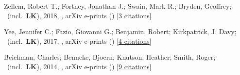 \item[{\color{numcolor}\scriptsize3}] Zellem, Robert T.; Fortney, Jonathan J.; Swain, Mark R.; Bryden, Geoffrey; \etal\ (incl.\ \textbf{LK}), 2018, , arXiv e-prints () [\href{https://ui.adsabs.harvard.edu/abs/2018arXiv180307163Z}{3 citations}]

\item[{\color{numcolor}\scriptsize2}] Yee, Jennifer C.; Fazio, Giovanni G.; Benjamin, Robert; Kirkpatrick, J. Davy; \etal\ (incl.\ \textbf{LK}), 2017, , arXiv e-prints () [\href{https://ui.adsabs.harvard.edu/abs/2017arXiv171004194Y}{4 citations}]

\item[{\color{numcolor}\scriptsize1}] Beichman, Charles; Benneke, Bjoern; Knutson, Heather; Smith, Roger; \etal\ (incl.\ \textbf{LK}), 2014, , arXiv e-prints () [\href{https://ui.adsabs.harvard.edu/abs/2014arXiv1411.1754B}{9 citations}]